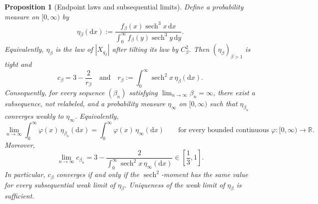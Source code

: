 \documentclass[10pt]{amsart}
\newtheorem{proposition}[proposition]{Proposition}
\theoremstyle{definition}
\theoremstyle{remark}
\numberwithin{equation}{section}
\newcommand{\R}{\mathbb R}
\newcommand{\1}{\mathbf 1}
\newcommand{\sech}{\operatorname{sech}}
\newcommand{\dd}{\,\mathrm d}
\begin{document}
\begin{proposition}[Endpoint laws and subsequential limits]
\label{prop:ft-endpoint-laws}
Define a probability measure on $[0,\infty)$ by
\begin{equation}
 \eta_\beta(\mathrm d x)
 :=\frac{f_\beta(x)\sech^3x\dd x}
        {\int_0^\infty f_\beta(y)\sech^3y\dd y}.
 \label{eq:ft-endpoint-law}
\end{equation}
Equivalently, $\eta_\beta$ is the law of $|X_{q_\beta}|$ after tilting its law by $C_\beta^2$.  Then $(\eta_\beta)_{\beta>1}$ is tight and
\begin{equation}
 c_\beta=3-\frac2{r_\beta}
 \quad\text{and}\quad
 r_\beta:=\int_0^\infty\sech^2x\,\eta_\beta(\mathrm d x).
 \label{eq:ft-c-endpoint-law}
\end{equation}
Consequently, for every sequence $(\beta_n)$ satisfying $\lim_{n\to\infty}\beta_n=\infty$, there exist a subsequence, not relabeled, and a probability measure $\eta_\infty$ on $[0,\infty)$ such that $\eta_{\beta_n}$ converges weakly to $\eta_\infty$.  Equivalently,
\begin{equation}
 \lim_{n\to\infty}
 \int_0^\infty\varphi(x)\,\eta_{\beta_n}(\mathrm d x)
 =
 \int_0^\infty\varphi(x)\,\eta_\infty(\mathrm d x)
 \qquad\text{for every bounded continuous }
 \varphi:[0,\infty)\to\R.
 \label{eq:ft-eta-subsequential-limit}
\end{equation}
Moreover,
\begin{equation}
 \lim_{n\to\infty}c_{\beta_n}
 =
 3-\frac2{\int_0^\infty\sech^2x\,\eta_\infty(\mathrm d x)}
 \in\left[\frac13,1\right].
 \label{eq:ft-c-subsequential-limit}
\end{equation}
In particular, $c_\beta$ converges if and only if the $\sech^2$-moment has the same value for every subsequential weak limit of $\eta_\beta$. Uniqueness of the weak limit of $\eta_\beta$ is sufficient.
\end{proposition}
\end{document}
